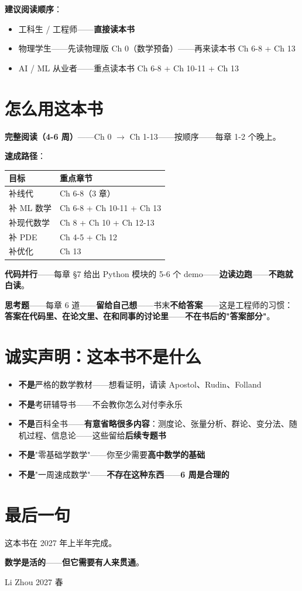 \textbf{建议阅读顺序}：

\begin{itemize}
\item 工科生 / 工程师——\textbf{直接读本书}
\item 物理学生——先读物理版 Ch 0（数学预备）——再来读本书 Ch 6-8 + Ch 13
\item AI / ML 从业者——重点读本书 Ch 6-8 + Ch 10-11 + Ch 13
\end{itemize}

\section*{怎么用这本书}

\textbf{完整阅读（4-6 周）}——Ch 0 $\to$ Ch 1-13——按顺序——每章 1-2 个晚上。

\textbf{速成路径}：

\begin{tabular}{ll}
\toprule
\textbf{目标} & \textbf{重点章节} \\
\midrule
补线代 & Ch 6-8（3 章） \\
补 ML 数学 & Ch 6-8 + Ch 10-11 + Ch 13 \\
补现代数学 & Ch 8 + Ch 10 + Ch 12-13 \\
补 PDE & Ch 4-5 + Ch 12 \\
补优化 & Ch 13 \\
\bottomrule
\end{tabular}

\textbf{代码并行}——每章 §7 给出 Python 模块的 5-6 个 demo——\textbf{边读边跑}——\textbf{不跑就白读}。

\textbf{思考题}——每章 6 道——\textbf{留给自己想}——书末\textbf{不给答案}——这是工程师的习惯：\textbf{答案在代码里、在论文里、在和同事的讨论里}——\textbf{不在书后的"答案部分"}。

\section*{诚实声明：这本书不是什么}

\begin{itemize}
\item \textbf{不是}严格的数学教材——想看证明，请读 Apostol、Rudin、Folland
\item \textbf{不是}考研辅导书——不会教你怎么对付李永乐
\item \textbf{不是}百科全书——\textbf{有意省略很多内容}：测度论、张量分析、群论、变分法、随机过程、信息论——这些留给\textbf{后续专题书}
\item \textbf{不是}"零基础学数学"——你至少需要\textbf{高中数学的基础}
\item \textbf{不是}"一周速成数学"——\textbf{不存在这种东西}——\textbf{6 周是合理的}
\end{itemize}

\section*{最后一句}

这本书在 2027 年上半年完成。

\medskip

\textbf{数学是活的}——\textbf{但它需要有人来贯通}。

\medskip

\hfill Li Zhou
\hfill 2027 春

\clearpage
